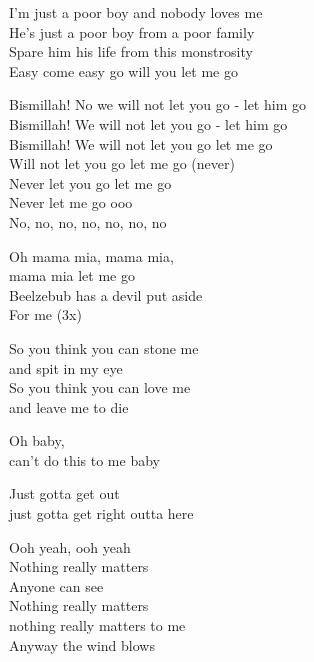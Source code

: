I'm just a poor boy and nobody loves me\\
He's just a poor boy from a poor family\\
Spare him his life from this monstrosity\\
Easy come easy go will you let me go

Bismillah! No we will not let you go - let him go\\
Bismillah! We will not let you go - let him go\\
Bismillah! We will not let you go let me go\\
Will not let you go let me go (never)\\
Never let you go let me go\\
Never let me go ooo\\
No, no, no, no, no, no, no

Oh mama mia, mama mia,\\
mama mia let me go\\
Beelzebub has a devil put aside\\
For me (3x)

So you think you can stone me\\
and spit in my eye\\
So you think you can love me\\
and leave me to die

Oh baby,\\
can't do this to me baby

Just gotta get out\\
just gotta get right outta here

Ooh yeah, ooh yeah\\
Nothing really matters\\
Anyone can see\\
Nothing really matters\\
nothing really matters to me\\
Anyway the wind blows

